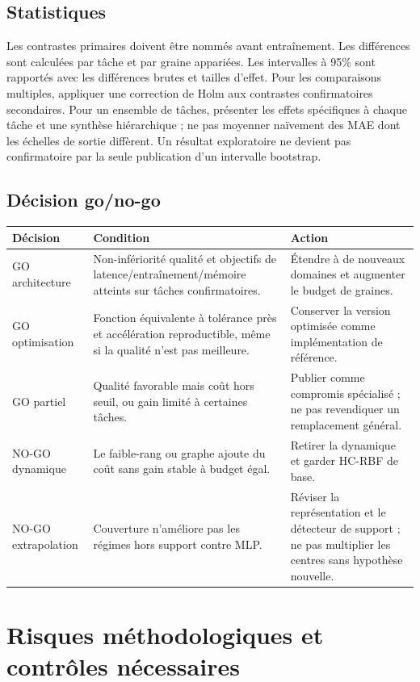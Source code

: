 \documentclass[11pt,a4paper]{article}
\begin{document}
\subsection{Statistiques}

Les contrastes primaires doivent être nommés avant entraînement. Les différences sont calculées par tâche et par graine appariées. Les intervalles à 95\% sont rapportés avec les différences brutes et tailles d'effet. Pour les comparaisons multiples, appliquer une correction de Holm aux contrastes confirmatoires secondaires. Pour un ensemble de tâches, présenter les effets spécifiques à chaque tâche et une synthèse hiérarchique ; ne pas moyenner naïvement des MAE dont les échelles de sortie diffèrent. Un résultat exploratoire ne devient pas confirmatoire par la seule publication d'un intervalle bootstrap.

\subsection{Décision go/no-go}

\begin{tabularx}{\textwidth}{P{2.3cm}YY}
\toprule
\textbf{Décision} & \textbf{Condition} & \textbf{Action}\\
\midrule
GO architecture & Non-infériorité qualité et objectifs de latence/entraînement/mémoire atteints sur tâches confirmatoires. & Étendre à de nouveaux domaines et augmenter le budget de graines.\\
GO optimisation & Fonction équivalente à tolérance près et accélération reproductible, même si la qualité n'est pas meilleure. & Conserver la version optimisée comme implémentation de référence.\\
GO partiel & Qualité favorable mais coût hors seuil, ou gain limité à certaines tâches. & Publier comme compromis spécialisé ; ne pas revendiquer un remplacement général.\\
NO-GO dynamique & Le faible-rang ou graphe ajoute du coût sans gain stable à budget égal. & Retirer la dynamique et garder HC-RBF de base.\\
NO-GO extrapolation & Couverture n'améliore pas les régimes hors support contre MLP. & Réviser la représentation et le détecteur de support ; ne pas multiplier les centres sans hypothèse nouvelle.\\
\bottomrule
\end{tabularx}

\section{Risques méthodologiques et contrôles nécessaires}
\end{document}
